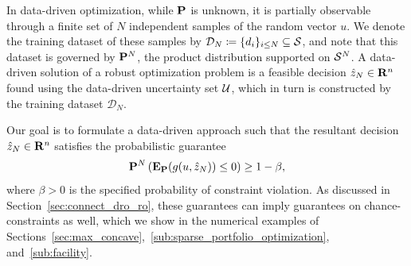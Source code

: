 In data-driven optimization, while ${\mathbf P}$ is unknown, it is partially observable through a finite set of $N$ independent samples of the random vector $u$.
We denote the training dataset of these samples by ${\mathcal{D}}_N \coloneqq \{d_i\}_{i\leq N} \subseteq \mathcal{S}$, and note that this dataset is governed by ${\mathbf P}^N$, the product distribution supported on $\mathcal{S}^{N}$.
A data-driven solution of a robust optimization problem is a feasible decision $\hat{z}_N \in {\mathbf R}^n$ found using the data-driven uncertainty set ${\mathcal{U}}$, which in turn is constructed by the training dataset ${\mathcal{D}}_N $.

Our goal is to formulate a data-driven approach such that the resultant decision $\hat{z}_N \in {\mathbf R}^n$ satisfies the probabilistic guarantee 
\begin{equation}
	\label{eq:prob_guarantees1}
	{\mathbf P}^N\left( \mathbf{E}_{{\mathbf P}}(g(u, \hat{z}_N)) \le 0\right) \ge 1 - \beta,
\end{equation}
where $\beta > 0$ is the specified probability of constraint violation. 
As discussed in Section~\ref{sec:connect_dro_ro}, these guarantees can imply guarantees on chance-constraints as well, which we show in the numerical examples of Sections~\ref{sec:max_concave},~\ref{sub:sparse_portfolio_optimization}, and~\ref{sub:facility}.



